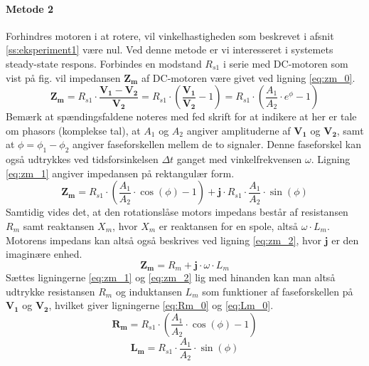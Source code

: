 \paragraph{Metode 2}
Forhindres motoren i at rotere, vil vinkelhastigheden som beskrevet i afsnit \ref{ss:eksperiment1} være nul.
Ved denne metode er vi interesseret i systemets steady-state respons.
Forbindes en modstand $R_{s1}$ i serie med DC-motoren som vist på fig. %
vil impedansen $\mathbf{Z_m}$ af DC-motoren være givet ved ligning \ref{eq:zm_0}.
\begin{equation}
	\mathbf{Z_m}=R_{s1}\cdot\frac{\mathbf{V_1}-\mathbf{V_2}}{\mathbf{V_2}}
			=R_{s1}\cdot\left(\frac{\mathbf{V_1}}{\mathbf{V_2}}-1\right)
			=R_{s1}\cdot\left(\frac{A_1}{A_2}\cdot{e}^{\phi}-1\right)
	\label{eq:zm_0} 
 \end{equation}
Bemærk at spændingsfaldene noteres med fed skrift for at indikere at her er tale om phasors (komplekse tal),
at $A_1$ og $A_2$ angiver amplituderne af $\mathbf{V_1}$ og $\mathbf{V_2}$,
samt at $\phi=\phi_1-\phi_2$ angiver faseforskellen mellem de to signaler.
Denne faseforskel kan også udtrykkes ved tidsforsinkelsen $\Delta{t}$ ganget med vinkelfrekvensen $\omega$.
Ligning \ref{eq:zm_1} angiver impedansen på rektangulær form.
\begin{equation}
	\mathbf{Z_m}=R_{s1}\cdot\left(\frac{A_1}{A_2}\cdot{\cos (\phi)}-1\right)	%
	+\mathbf{j}\cdot{R_{s1}}\cdot\frac{A_1}{A_2}\cdot\sin(\phi)	%
	\label{eq:zm_1} 
 \end{equation}
Samtidig vides det, at den rotationslåse motors impedans består af resistansen $R_m$ samt
reaktansen $X_m$, hvor $X_m$ er reaktansen for en spole, altså $\omega\cdot{L_m}$.
Motorens impedans kan altså også beskrives ved ligning \ref{eq:zm_2}, hvor $\mathbf{j}$ er den imaginære enhed.
\begin{equation}
	\mathbf{Z_m}=R_m+\mathbf{j}\cdot\omega\cdot{L_m}
	\label{eq:zm_2} 
 \end{equation}
Sættes ligningerne \ref{eq:zm_1} og \ref{eq:zm_2} lig med hinanden
kan man altså udtrykke resistansen $R_m$ og induktansen $L_m$ som funktioner
af faseforskellen på $\mathbf{V_1}$ og $\mathbf{V_2}$,
hvilket giver ligningerne \ref{eq:Rm_0} og \ref{eq:Lm_0}.
\begin{equation}
	\mathbf{R_m}=R_{s1}\cdot\left(\frac{A_1}{A_2}\cdot{\cos (\phi)}-1\right)
	\label{eq:Rm_0} 
 \end{equation}
\begin{equation}
	\mathbf{L_m}=R_{s1}\cdot\frac{A_1}{A_2}\cdot\sin(\phi)
	\label{eq:Lm_0} 
 \end{equation}

